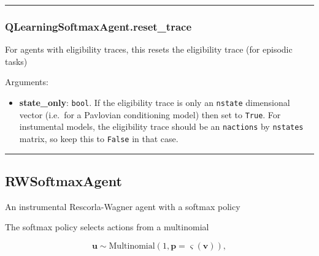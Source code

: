 \begin{center}\rule{0.5\linewidth}{\linethickness}\end{center}

\subsubsection{QLearningSoftmaxAgent.reset\_trace}\label{qlearningsoftmaxagent.reset_trace}

\begin{Shaded}
\begin{Highlighting}[]
\OperatorTok{=}\NormalTok{)}
\end{Highlighting}
\end{Shaded}

For agents with eligibility traces, this resets the eligibility trace
(for episodic tasks)

Arguments:

\begin{itemize}
\tightlist
\item
  \textbf{state\_only}: \texttt{bool}. If the eligibility trace is only
  an \texttt{nstate} dimensional vector (i.e.~for a Pavlovian
  conditioning model) then set to \texttt{True}. For instumental models,
  the eligibility trace should be an \texttt{nactions} by
  \texttt{nstates} matrix, so keep this to \texttt{False} in that case.
\end{itemize}

\begin{center}\rule{0.5\linewidth}{\linethickness}\end{center}

\subsection{RWSoftmaxAgent}\label{rwsoftmaxagent}

\begin{Shaded}
\begin{Highlighting}[]
\end{Highlighting}
\end{Shaded}

An instrumental Rescorla-Wagner agent with a softmax policy

The softmax policy selects actions from a multinomial

\[
\mathbf u \sim \mathrm{Multinomial}(1, \mathbf p=\varsigma(\mathbf v)),
\]

